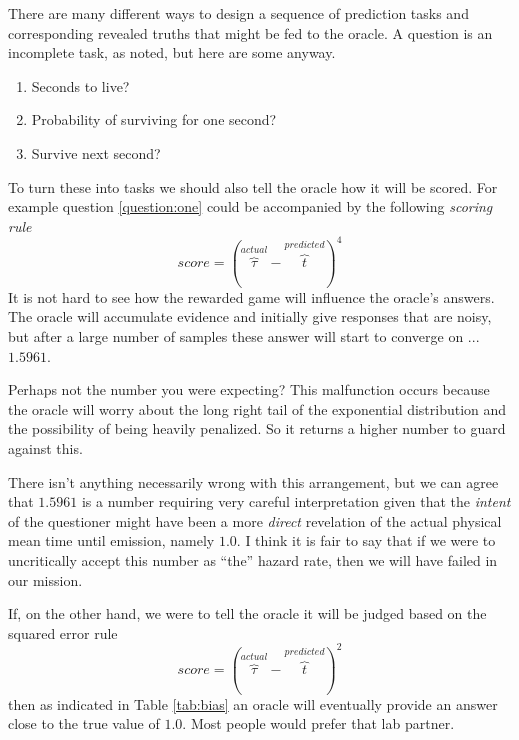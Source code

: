There are many different ways to design a sequence of prediction tasks and corresponding revealed truths that might be fed to the oracle. A question is an incomplete task, as noted, but here are some anyway. 

\begin{enumerate}
    \item Seconds to live?  \label{question:one}
    \item Probability of surviving for one second? \label{question:two}
    \item Survive next second? \label{question:three}
\end{enumerate}
To turn these into tasks we should also tell the oracle how it will be scored. For example question \ref{question:one} could be accompanied by the following {\em scoring rule}
\begin{equation}
\label{eqn:fourth}
    score = (\overbrace{\tau}^{actual} - \overbrace{t}^{predicted})^4 
\end{equation}
It is not hard to see how the rewarded game will influence the oracle's answers. The oracle will accumulate evidence and initially give responses that are noisy, but after a large number of samples these answer will start to converge on ... $1.5961$. 

Perhaps not the number you were expecting? This malfunction occurs because the oracle will worry about the long right tail of the exponential distribution and the possibility of being heavily penalized. So it returns a higher number to guard against this.

There isn't anything necessarily wrong with this arrangement, but we can agree that $1.5961$ is a number requiring very careful interpretation given that the {\em intent} of the questioner might have been a more {\em direct} revelation of the actual physical mean time until emission, namely $1.0$. I think it is fair to say that if we were to uncritically accept this number as ``the'' hazard rate, then we will have failed in our mission. 

If, on the other hand, we were to tell the oracle it will be judged based on the squared error rule
\begin{equation}
\label{eqn:square}
    score = (\overbrace{\tau}^{actual} - \overbrace{t}^{predicted})^2 
\end{equation}
then as indicated in Table \ref{tab:bias} an oracle will eventually provide an answer close to the true value of $1.0$. Most people would prefer that lab partner. 

